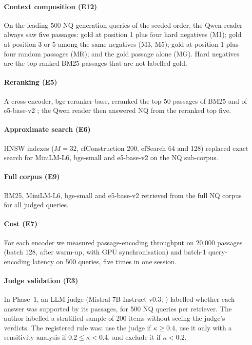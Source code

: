 \paragraph{Context composition (E12)} On the leading 500 NQ generation queries of the seeded order, the Qwen reader always saw five passages: gold at position 1 plus four hard negatives (M1); gold at position 3 or 5 among the same negatives (M3, M5); gold at position 1 plus four random passages (MR); and the gold passage alone (MG). Hard negatives are the top-ranked BM25 passages that are not labelled gold.
\paragraph{Reranking (E5)} A cross-encoder, bge-reranker-base, reranked the top 50 passages of BM25 and of e5-base-v2 \citep{nogueira2019passage,xiao2024cpack}; the Qwen reader then answered NQ from the reranked top five.
\paragraph{Approximate search (E6)} HNSW indexes \citep{malkov2020hnsw} ($M=32$, efConstruction 200, efSearch 64 and 128) replaced exact search for MiniLM-L6, bge-small and e5-base-v2 on the NQ sub-corpus.
\paragraph{Full corpus (E9)} BM25, MiniLM-L6, bge-small and e5-base-v2 retrieved from the full NQ corpus for all judged queries.
\paragraph{Cost (E7)} For each encoder we measured passage-encoding throughput on 20,000 passages (batch 128, after warm-up, with GPU synchronisation) and batch-1 query-encoding latency on 500 queries, five times in one session.
\paragraph{Judge validation (E3)} In Phase~1, an LLM judge (Mistral-7B-Instruct-v0.3; \citealp{jiang2023mistral}) labelled whether each answer was supported by its passages, for 500 NQ queries per retriever. The author labelled a stratified sample of 200 items without seeing the judge's verdicts. The registered rule was: use the judge if $\kappa\ge0.4$, use it only with a sensitivity analysis if $0.2\le\kappa<0.4$, and exclude it if $\kappa<0.2$.
